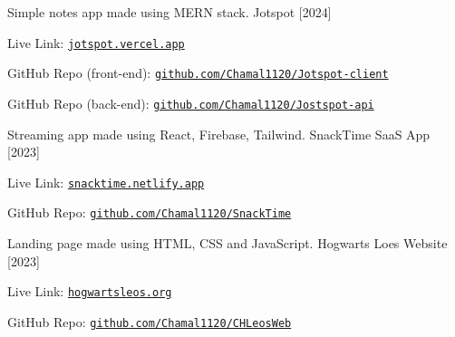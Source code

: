 

\begin{cventries}

  \cventry
    {Simple notes app made using MERN stack.} %
    {Jotspot [2024]} %
    {} %
    {} %
    {
      \begin{cvitems} %
        \item Live Link: \href{https://jotspot.vercel.app/}{\nolinkurl{jotspot.vercel.app}}
        \item GitHub Repo (front-end): \href{https://github.com/Chamal1120/Jotspot-client}{\nolinkurl{github.com/Chamal1120/Jotspot-client}}
        \item GitHub Repo (back-end): \href{https://github.com/Chamal1120/Jostspot-api}{\nolinkurl{github.com/Chamal1120/Jostspot-api}}
      \end{cvitems}
    }

  \cventry
    {Streaming app made using React, Firebase, Tailwind.} %
    {SnackTime SaaS App [2023]} %
    {} %
    {} %
    {
      \begin{cvitems} %
        \item Live Link: \href{https://snacktime.netlify.app}{\nolinkurl{snacktime.netlify.app}}
        \item GitHub Repo: \href{https://github.com/Chamal1120/SnackTime}{\nolinkurl{github.com/Chamal1120/SnackTime}}
      \end{cvitems}
    }

  \cventry
    {Landing page made using HTML, CSS and JavaScript.} %
    {Hogwarts Loes Website [2023]} %
    {} %
    {} %
    {
      \begin{cvitems} %
        \item Live Link: \href{https://hogwartsleos.org}{\nolinkurl{hogwartsleos.org}}
        \item GitHub Repo: \href{https://github.com/Chamal1120/CHLeosWeb}{\nolinkurl{github.com/Chamal1120/CHLeosWeb}}
      \end{cvitems}
    }

\end{cventries}
